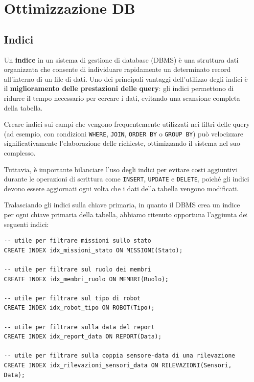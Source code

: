 \section{Ottimizzazione DB}

\subsection{Indici}

Un \textbf{indice} in un sistema di gestione di database (DBMS) è una struttura dati organizzata che consente di individuare rapidamente un determinato record all'interno di un file di dati. Uno dei principali vantaggi dell'utilizzo degli indici è il \textbf{miglioramento delle prestazioni delle query}: gli indici permettono di ridurre il tempo necessario per cercare i dati, evitando una scansione completa della tabella.

Creare indici sui campi che vengono frequentemente utilizzati nei filtri delle query (ad esempio, con condizioni \texttt{WHERE}, \texttt{JOIN}, \texttt{ORDER BY} o \texttt{GROUP BY}) può velocizzare significativamente l'elaborazione delle richieste, ottimizzando il sistema nel suo complesso.

Tuttavia, è importante bilanciare l'uso degli indici per evitare costi aggiuntivi durante le operazioni di scrittura come \texttt{INSERT}, \texttt{UPDATE} e \texttt{DELETE}, poiché gli indici devono essere aggiornati ogni volta che i dati della tabella vengono modificati.

Tralasciando gli indici sulla chiave primaria, in quanto il DBMS crea un indice per ogni chiave primaria della tabella, abbiamo ritenuto opportuna l'aggiunta dei seguenti indici: \\

\begin{lstlisting}
-- utile per filtrare missioni sullo stato
CREATE INDEX idx_missioni_stato ON MISSIONI(Stato); 

-- utile per filtrare sul ruolo dei membri
CREATE INDEX idx_membri_ruolo ON MEMBRI(Ruolo); 

-- utile per filtrare sul tipo di robot
CREATE INDEX idx_robot_tipo ON ROBOT(Tipo); 

-- utile per filtrare sulla data del report
CREATE INDEX idx_report_data ON REPORT(Data);

-- utile per filtrare sulla coppia sensore-data di una rilevazione
CREATE INDEX idx_rilevazioni_sensori_data ON RILEVAZIONI(Sensori, Data);
\end{lstlisting}

